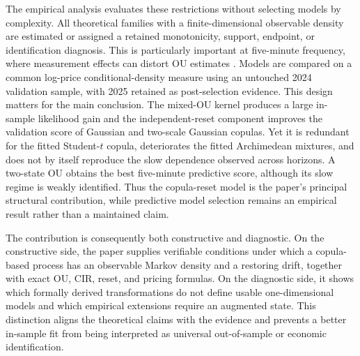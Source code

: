 The empirical analysis evaluates these restrictions without selecting models
by complexity.  All theoretical families with a finite-dimensional observable
density are estimated or assigned a retained monotonicity, support, endpoint,
or identification diagnosis.  This is particularly important at five-minute
frequency, where measurement effects can distort OU estimates
\citep{HolyTomanova2018}.  Models are compared on a common log-price
conditional-density measure using an untouched 2024 validation sample, with
2025 retained as post-selection evidence.  This design matters for the main
conclusion.  The mixed-OU kernel produces a large in-sample likelihood gain and
the independent-reset component improves the validation score of Gaussian and
two-scale Gaussian copulas.  Yet it is redundant for the fitted Student-$t$
copula, deteriorates the fitted Archimedean mixtures, and does not by itself
reproduce the slow dependence observed across horizons.  A two-state OU obtains
the best five-minute predictive score, although its slow regime is weakly
identified.  Thus the copula-reset model is the paper's principal structural
contribution, while predictive model selection remains an empirical result
rather than a maintained claim.

The contribution is consequently both constructive and diagnostic.  On the
constructive side, the paper supplies verifiable conditions under which a
copula-based process has an observable Markov density and a restoring drift,
together with exact OU, CIR, reset, and pricing formulas.  On the diagnostic
side, it shows which formally derived transformations do not define usable
one-dimensional models and which empirical extensions require an augmented
state.  This distinction aligns the theoretical claims with the evidence and
prevents a better in-sample fit from being interpreted as universal
out-of-sample or economic identification.
